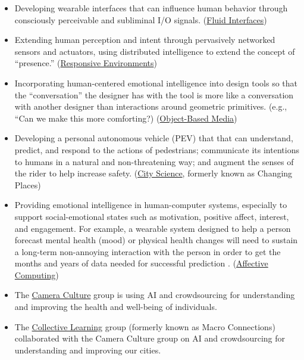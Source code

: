 \begin{itemize}
\item Developing wearable interfaces that can influence human behavior through consciously perceivable and subliminal I/O signals. (\href{https://www.media.mit.edu/groups/fluid-interfaces/overview/}{Fluid Interfaces})

\item Extending human perception and intent through pervasively networked sensors and actuators, using distributed intelligence to extend the concept of ``presence.'' (\href{https://www.media.mit.edu/groups/responsive-environments/overview/}{Responsive Environments})

\item Incorporating human-centered emotional intelligence into design tools so that the ``conversation'' the designer has with the tool is more like a conversation with another designer than interactions around geometric primitives. (e.g., ``Can we make this more comforting?) (\href{https://www.media.mit.edu/groups/object-based-media/overview/}{Object-Based Media})

\item Developing a personal autonomous vehicle (PEV) that that can understand, predict, and respond to the actions of pedestrians; communicate its intentions to humans in a natural and non-threatening way; and augment the senses of the rider to help increase safety. (\href{https://www.media.mit.edu/groups/city-science/overview/}{City Science}, formerly known as Changing Places)

\item Providing emotional intelligence in human-computer systems, especially to support social-emotional states such as motivation, positive affect, interest, and engagement. For example, a wearable system designed to help a person forecast mental health (mood) or physical health changes will need to sustain a long-term non-annoying interaction with the person in order to get the months and years of data needed for successful prediction \cite{clark1998extended}. (\href{https://www.media.mit.edu/groups/affective-computing/overview/}{Affective Computing})

\item The \href{https://www.media.mit.edu/groups/camera-culture/overview/}{Camera Culture} group is using \ac{AI} and crowdsourcing for understanding and improving the health and well-being of individuals.

\item The \href{https://www.media.mit.edu/groups/collective-learning/overview/}{Collective Learning} group (formerly known as Macro Connections) collaborated with the Camera Culture group on \ac{AI} and crowdsourcing for understanding and improving our cities.


\end{itemize}
